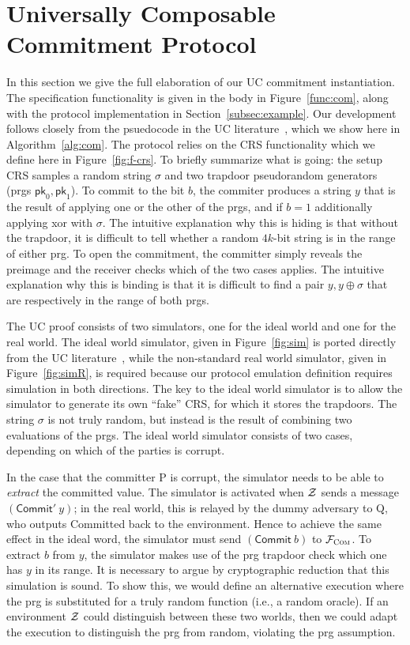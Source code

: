 \section{Universally Composable Commitment Protocol}
\label{app:ucc}
In this section we give the full elaboration of our UC commitment instantiation.
The specification functionality is given in the body in Figure~\ref{func:com},
along with the protocol implementation in Section~\ref{subsec:example}.
Our development follows closely from the psuedocode in the UC literature~\cite{canetti2001commitments}, which we show here in Algorithm~\ref{alg:com}.
The protocol relies on the CRS functionality which we define here in Figure~\ref{fig:f-crs}.
To briefly summarize what is going: the setup CRS samples a random string $\sigma$ and two trapdoor pseudorandom generators (prgs $\mathsf{pk}_0, \mathsf{pk}_1$).
To commit to the bit $b$, the commiter produces a string $y$ that is the result of applying one or the other of the prgs, and if $b=1$ additionally applying xor with $\sigma$.
The intuitive explanation why this is hiding is that without the trapdoor, it is difficult to tell whether a random $4k$-bit string is in the range of either prg. To open the commitment, the committer simply reveals the preimage and the receiver checks which of the two cases applies. The intuitive explanation why this is binding is that it is difficult to find a pair $y,y\oplus\sigma$ that are respectively in the range of both prgs.

The UC proof consists of two simulators, one for the ideal world and one for the real world.
The ideal world simulator, given in Figure~\ref{fig:sim} is ported directly from the UC literature~\cite{canetti2001commitments}, while the non-standard real world simulator, given in Figure~\ref{fig:simR}, is required because our protocol emulation definition requires simulation in both directions.
The key to the ideal world simulator is to allow the simulator to generate its own ``fake'' CRS, for which it stores the trapdoors. The string $\sigma$ is not truly random, but instead is the result of combining two evaluations of the prgs.
The ideal world simulator consists of two cases, depending on which of the parties is corrupt.

In the case that the committer P is corrupt, the simulator needs to be able to \emph{extract} the committed value. The simulator is activated when $\mathcal{{Z}}$ sends a message $(\mathsf{Commit}' ~ y)$; in the real world, this is relayed by the dummy adversary to Q, who outputs \textsf{Committed} back to the environment. Hence to achieve the same effect in the ideal word, the simulator must send $(\mathsf{Commit}~b)$ to $\mathcal{{F}}_{\textsc{Com}}$. To extract $b$ from $y$, the simulator makes use of the prg trapdoor check which one has $y$ in its range.
It is necessary to argue by cryptographic reduction that this simulation is sound.
To show this, we would define an alternative execution where the prg is substituted for a truly random function (i.e., a random oracle). If an environment $\mathcal{{Z}}$ could distinguish between these two worlds, then we could adapt the execution to distinguish the prg from random, violating the prg assumption.

